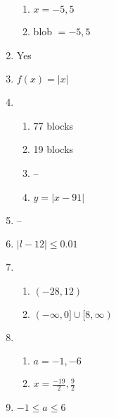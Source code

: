 \documentclass{article}
\begin{document}
\begin{enumerate}
	\begin{enumerate}
	
	\item $x = -5, 5$
	
	\item blob $= -5, 5$
	
	\end{enumerate}
	
\item Yes

\item $f(x) = |x|$

\item

	\begin{enumerate}
	
	\item 77 blocks
	
	\item 19 blocks
	
	\item --
	
	\item $y = |x - 91|$
	
	\end{enumerate}
	
\item --

\item $| l - 12 | \leq 0.01$

\item 

	\begin{enumerate}
	
	\item $(-28,12)$
	
	\item $(-\infty, 0] \cup [8, \infty)$
	
	\end{enumerate}
	
\item

	\begin{enumerate}
	
	\item $a = -1, -6$
	
	\item $x = \frac{-19}{2}, \frac{9}{2}$
	
	\end{enumerate}
	
\item $-1 \leq a \leq 6$


\end{enumerate}
\end{document}

